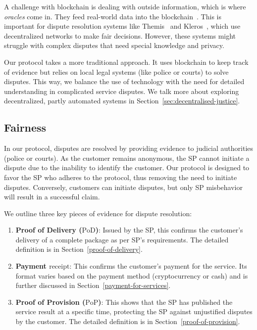 \documentclass[pdftex,twocolumn,epjc3]{svjour3}
\begin{document}
A challenge with blockchain is dealing with outside information, which is where \textit{oracles} come in. They feed real-world data into the blockchain~\cite{breidenbachChainlinkNextSteps2021}. This is important for dispute resolution systems like Themis~\cite{mengThemisDecentralizedEscrow2019} and Kleros~\cite{bergollaKlerosSociolegalCase2022}, which use decentralized networks to make fair decisions. However, these systems might struggle with complex disputes that need special knowledge and privacy.

Our protocol takes a more traditional approach. It uses blockchain to keep track of evidence but relies on local legal systems (like police or courts) to solve disputes. This way, we balance the use of technology with the need for detailed understanding in complicated service disputes. We talk more about exploring decentralized, partly automated systems in Section~\ref{sec:decentralised-justice}.

\subsection{Fairness}\label{fairness}
In our protocol, disputes are resolved by providing evidence to judicial authorities (police or courts). As the customer remains anonymous, the SP cannot initiate a dispute due to the inability to identify the customer. Our protocol is designed to favor the SP who adheres to the protocol, thus removing the need to initiate disputes. Conversely, customers can initiate disputes, but only SP misbehavior will result in a successful claim.

We outline three key pieces of evidence for dispute resolution:

\begin{enumerate}
    \item \textbf{Proof of Delivery ($\textrm{PoD}$)}: Issued by the SP, this confirms the customer's delivery of a complete package as per SP's requirements. The detailed definition is in Section~\ref{proof-of-delivery}.
    
    \item \textbf{Payment $\textrm{receipt}$}: This confirms the customer's payment for the service. Its format varies based on the payment method (cryptocurrency or cash) and is further discussed in Section~\ref{payment-for-services}.
    
    \item \textbf{Proof of Provision ($\textrm{PoP}$)}: This shows that the SP has published the service result at a specific time, protecting the SP against unjustified disputes by the customer. The detailed definition is in Section~\ref{proof-of-provision}.
\end{enumerate}
\end{document}
